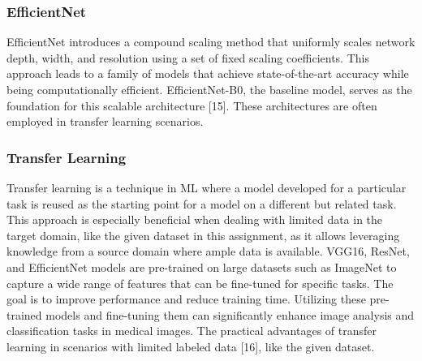 \documentclass[a4paper, twocolumn, 11pt]{article}
\begin{document}
\subsubsection{EfficientNet}
EfficientNet introduces a compound scaling method that uniformly scales network depth, width, and resolution using a set of fixed scaling coefficients. This approach leads to a family of models that achieve state-of-the-art accuracy while being computationally efficient. EfficientNet-B0, the baseline model, serves as the foundation for this scalable architecture [15]. These architectures are often employed in transfer learning scenarios.
\vspace{7pt}

\subsubsection{Transfer Learning}
Transfer learning is a technique in ML where a model developed for a particular task is reused as the starting point for a model on a different but related task. This approach is especially beneficial when dealing with limited data in the target domain, like the given dataset in this assignment, as it allows leveraging knowledge from a source domain where ample data is available. VGG16, ResNet, and EfficientNet models are pre-trained on large datasets such as ImageNet to capture a wide range of features that can be fine-tuned for specific tasks. The goal is to improve performance and reduce training time.  Utilizing these pre-trained models and fine-tuning them can significantly enhance image analysis and classification tasks in medical images. The practical advantages of transfer learning in scenarios with limited labeled data [16], like the given dataset.
\vspace{7pt}
\end{document}
